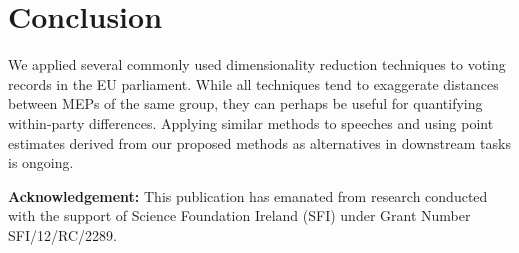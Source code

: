 \documentclass{llncs}
\begin{document}
\section{Conclusion}
We applied several commonly used dimensionality reduction techniques to voting records in the EU parliament. While all techniques tend to exaggerate distances between MEPs of the same group, they can perhaps be useful for quantifying within-party differences. Applying similar methods to speeches and using point estimates derived from our proposed methods as alternatives in downstream tasks is ongoing. 


\vspace{3mm}
\noindent\textbf{Acknowledgement:} This publication has emanated from research conducted with the support of Science Foundation Ireland (SFI) under Grant Number SFI/12/RC/2289.


 
\end{document}
